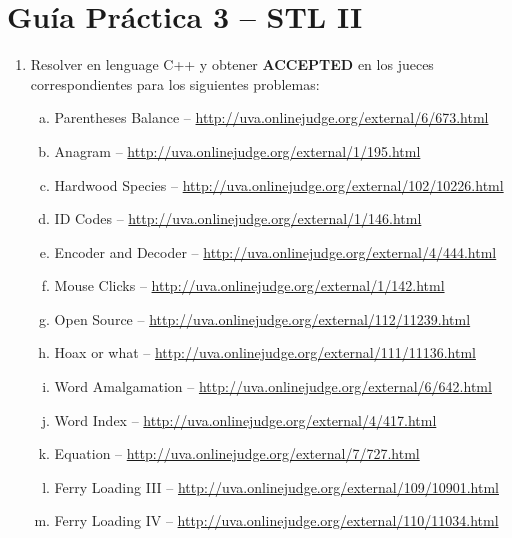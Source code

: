 




\section*{Gu\'ia Pr\'actica 3 -- STL II}

\begin{enumerate}[1 -]
	
	\item Resolver en lenguage C++ y obtener \textbf{ACCEPTED} en los jueces correspondientes para los siguientes problemas:
	
	\begin{enumerate}[a)]	
		\item Parentheses Balance -- \href{http://uva.onlinejudge.org/external/6/673.html}{http://uva.onlinejudge.org/external/6/673.html}
		\item Anagram -- \href{http://uva.onlinejudge.org/external/1/195.html}{http://uva.onlinejudge.org/external/1/195.html}
		\item Hardwood Species -- \href{http://uva.onlinejudge.org/external/102/10226.html}{http://uva.onlinejudge.org/external/102/10226.html} 
		\item ID Codes -- \href{http://uva.onlinejudge.org/external/1/146.html}{http://uva.onlinejudge.org/external/1/146.html}
		\item Encoder and Decoder -- \href{http://uva.onlinejudge.org/external/4/444.html}{http://uva.onlinejudge.org/external/4/444.html}
		\item Mouse Clicks -- \href{http://uva.onlinejudge.org/external/1/142.html}{http://uva.onlinejudge.org/external/1/142.html}	
		\item Open Source -- \href{http://uva.onlinejudge.org/external/112/11239.html}{http://uva.onlinejudge.org/external/112/11239.html}	
		\item Hoax or what -- \href{http://uva.onlinejudge.org/external/111/11136.html}{http://uva.onlinejudge.org/external/111/11136.html}		
		\item Word Amalgamation -- \href{http://uva.onlinejudge.org/external/6/642.html}{http://uva.onlinejudge.org/external/6/642.html}
		\item Word Index -- \href{http://uva.onlinejudge.org/external/4/417.html}{http://uva.onlinejudge.org/external/4/417.html}
		\item Equation -- \href{http://uva.onlinejudge.org/external/7/727.html}{http://uva.onlinejudge.org/external/7/727.html}
		\item Ferry Loading III -- \href{http://uva.onlinejudge.org/external/109/10901.html}{http://uva.onlinejudge.org/external/109/10901.html}		
		\item Ferry Loading IV -- \href{http://uva.onlinejudge.org/external/110/11034.html}{http://uva.onlinejudge.org/external/110/11034.html}
	\end{enumerate}


\end{enumerate}


